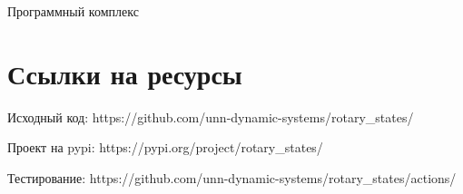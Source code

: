 \begin{chapter}{Программный комплекс}




\section{Ссылки на ресурсы}
Исходный код: https://github.com/unn-dynamic-systems/rotary\_states/

Проект на pypi: https://pypi.org/project/rotary\_states/

Тестирование: https://github.com/unn-dynamic-systems/rotary\_states/actions/

\end{chapter}